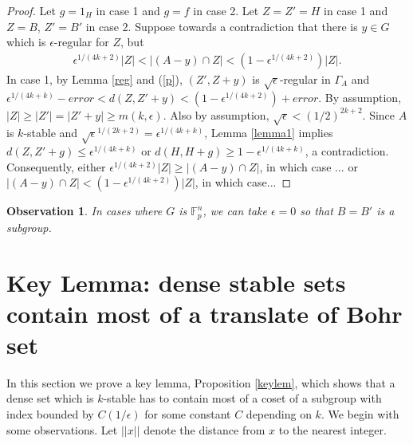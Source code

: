 \documentclass[11pt]{article}
\newtheorem{observation}{Observation}
\theoremstyle{definition}
\begin{document}
\begin{proof}
Let $g=1_H$ in case 1 and $g=f$ in case 2.  Let $Z=Z'=H$ in case 1 and $Z=B$, $Z'=B'$ in case 2.  Suppose towards a contradiction that there is $y\in G$ which is $\epsilon$-regular for $Z$, but 
\begin{align}\label{p}
\epsilon^{1/(4k+2)}|Z|<|(A-y)\cap Z|<(1-\epsilon^{1/(4k+2)})|Z|.
\end{align}
In case 1, by Lemma \ref{reg} and (\ref{p}), $(Z',Z+y)$ is $\sqrt{\epsilon}$-regular in $\Gamma_A$ and $\epsilon^{1/(4k+k)}-error<d(Z,Z'+y)<(1-\epsilon^{1/(4k+2)})+error$.  By assumption, $|Z|\geq |Z'|=|Z'+y|\geq  m(k,\epsilon)$.  Also by assumption, $\sqrt{\epsilon}<(1/2)^{2k+2}$.  Since $A$ is $k$-stable and $\sqrt{\epsilon}^{1/(2k+2)}=\epsilon^{1/(4k+k)}$, Lemma \ref{lemma1} implies $d(Z,Z'+g)\leq \epsilon^{1/(4k+k)}$ or $d(H,H+g)\geq 1-\epsilon^{1/(4k+k)}$, a contradiction. Consequently, either $\epsilon^{1/(4k+2)}|Z|\geq |(A-y)\cap Z|$, in which case ... or $|(A-y)\cap Z|<(1-\epsilon^{1/(4k+2)})|Z|$, in which case...
\end{proof}

\begin{observation}
In cases where $G$ is $\mathbb{F}_p^n$, we can take $\epsilon=0$ so that $B=B'$ is a subgroup.
\end{observation}


\section{Key Lemma: dense stable sets contain most of a translate of Bohr set}

In this section we prove a key lemma, Proposition \ref{keylem}, which shows that a dense set which is $k$-stable has to contain most of a coset of a subgroup with index bounded by $C(1/\epsilon)$ for some constant $C$ depending on $k$. We begin with some observations.  Let $||x||$ denote the distance from $x$ to the nearest integer.
\end{document}
